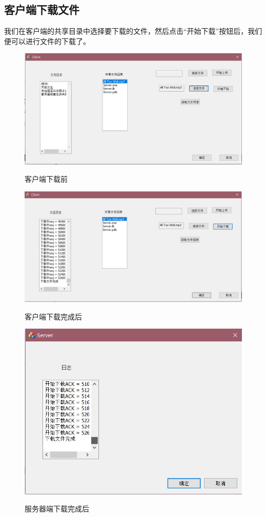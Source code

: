 \subsection{客户端下载文件}
我们在客户端的共享目录中选择要下载的文件，然后点击“开始下载”按钮后，我们便可以进行文件的下载了。
\begin{figure}[H]
  \centering
  \includegraphics[width=0.8\linewidth]{figure/client_before_download}\\
  \caption{客户端下载前}
\end{figure}
\begin{figure}[H]
  \centering
  \includegraphics[width=0.8\linewidth]{figure/client_after_download}\\
  \caption{客户端下载完成后}
\end{figure}
\begin{figure}[H]
  \centering
  \includegraphics[width=0.8\linewidth]{figure/server_download}\\
  \caption{服务器端下载完成后}
\end{figure}

